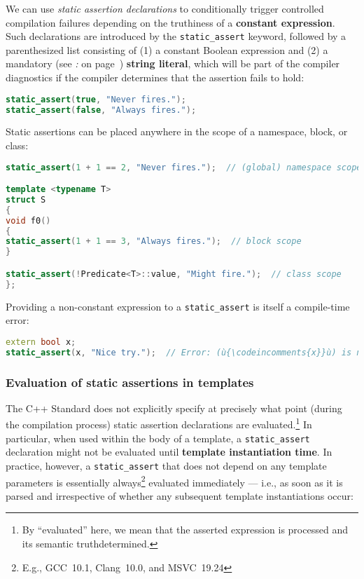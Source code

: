 We can use \emph{static assertion declarations} to conditionally trigger
controlled compilation failures depending on the truthiness of a
\textbf{constant expression}. Such declarations are introduced by the
\texttt{static\_assert} keyword, followed by a parenthesized list
consisting of (1) a constant Boolean expression and (2) a mandatory (see
{\it{}: } on page~\pageref{mandatory-string-literal}) \textbf{string literal}, which will be
part of the compiler diagnostics if the compiler determines that the
assertion fails to hold:

\begin{lstlisting}[language=C++]
static_assert(true, "Never fires.");
static_assert(false, "Always fires.");
\end{lstlisting}

\noindent Static assertions can be placed anywhere in the scope of a namespace,
block, or class:

\begin{lstlisting}[language=C++]
static_assert(1 + 1 == 2, "Never fires.");  // (global) namespace scope

template <typename T>
struct S
{
void f0()
{
static_assert(1 + 1 == 3, "Always fires.");  // block scope
}

static_assert(!Predicate<T>::value, "Might fire.");  // class scope
};
\end{lstlisting}

\noindent Providing a non-constant expression to a \texttt{static\_assert} is
itself a compile-time error:

\begin{lstlisting}[language=C++]
extern bool x;
static_assert(x, "Nice try.");  // Error: (ù{\codeincomments{x}}ù) is not a compile-time constant.
\end{lstlisting}


\subsubsection[Evaluation of static assertions in templates]{Evaluation of static assertions in templates}\label{evaluation-of-static-assertions-in-templates}

The C++ Standard does not explicitly specify at precisely what point (during
the compilation process) static assertion declarations are
evaluated.{\cprotect\footnote{By ``evaluated'' here, we mean that the
asserted expression is processed and its semantic truth\linebreak[4] determined.}}
In particular, when used within the body of a template, a
\texttt{static\_assert} declaration might not be evaluated until
\textbf{template instantiation time}. In practice, however, a
\texttt{static\_assert} that does not depend on any template parameters
is essentially always{\cprotect\footnote{E.g.,
GCC~10.1, Clang~10.0, and MSVC~19.24}} evaluated immediately --- i.e., as
soon as it is parsed and irrespective of whether any subsequent template
instantiations occur:

